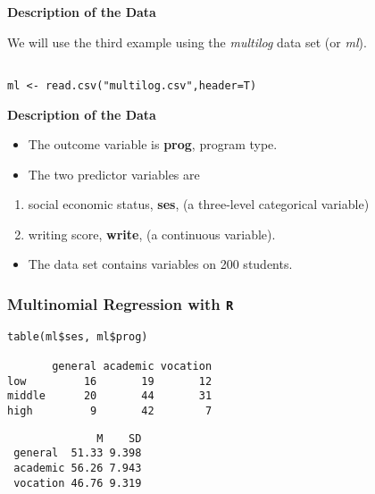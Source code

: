 \documentclass[00-GLMregslides.tex]{subfiles}
\begin{document}
\begin{frame}[fragile]
\Large
\textbf{Description of the Data}
 
We will use the third example using the \textit{multilog} data set (or \textit{ml}).


\begin{framed}
\begin{verbatim}

ml <- read.csv("multilog.csv",header=T)
\end{verbatim}
\end{framed}
 
 
\end{frame}
\begin{frame}[fragile]
\Large	
	\textbf{Description of the Data}
\begin{itemize}
\item The outcome variable is \textbf{prog}, program type. 
\item The two predictor variables are
\end{itemize}
{ \Large
\begin{enumerate}
 \item social economic status, \textbf{ses}, (a three-level categorical variable) 
 \item writing score, \textbf{write}, (a continuous variable).
\end{enumerate} 
}
\begin{itemize}
\item The data set contains variables on 200 students.
\end{itemize}
\end{frame} 
\begin{frame}[fragile]
\Large
\frametitle{Multinomial Regression with \texttt{R}}
\Large

\begin{verbatim}
table(ml$ses, ml$prog)

       general academic vocation
low         16       19       12
middle      20       44       31
high         9       42        7
\end{verbatim} 
 
\begin{verbatim} 
              M    SD
 general  51.33 9.398
 academic 56.26 7.943
 vocation 46.76 9.319
\end{verbatim} 

\end{frame}
\end{document}
